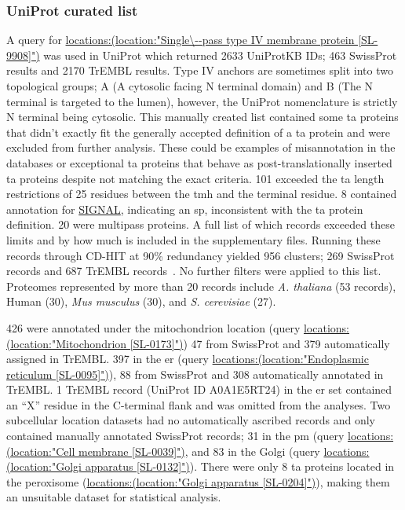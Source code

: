 \subsubsection{UniProt curated list}
A query for \url{locations:(location:"Single\--pass type IV membrane protein [SL-9908]")} was used in UniProt which returned 2633 UniProtKB IDs; 463 SwissProt results and 2170 TrEMBL results.
Type IV anchors are sometimes split into two topological groups; A (A cytosolic facing N terminal domain) and B (The N terminal is targeted to the lumen), however, the UniProt nomenclature is strictly N terminal being cytosolic.
This manually created list contained some \gls{ta} proteins that didn't exactly fit the generally accepted definition of a \gls{ta} protein and were excluded from further analysis.
These could be examples of misannotation in the databases or exceptional \gls{ta} proteins that behave as post\--translationally inserted \gls{ta} proteins despite not matching the exact criteria.
101 exceeded the \gls{ta} length restrictions of 25 residues between the \gls{tmh} and the terminal residue.
8 contained annotation for \url{SIGNAL}, indicating an \gls{sp}, inconsistent with the \gls{ta} protein definition.
20 were multipass proteins.
A full list of which records exceeded these limits and by how much is included in the supplementary files.
Running these records through CD-HIT at 90\% redundancy yielded 956 clusters; 269 SwissProt records and 687 TrEMBL records~\cite{Huang2010, Wu2011}.
No further filters were applied to this list.
Proteomes represented by more than 20 records include \textit{A. thaliana} (53 records), Human (30), \textit{Mus musculus} (30), and \textit{S. cerevisiae} (27). %

426 were annotated under the mitochondrion location (query \url{locations:(location:"Mitochondrion [SL-0173]")}) 47 from SwissProt and 379 automatically assigned in TrEMBL.
397 in the \gls{er} (query \url{locations:(location:"Endoplasmic reticulum [SL-0095]")}), 88 from SwissProt and 308 automatically annotated in TrEMBL.
1 TrEMBL record (UniProt ID A0A1E5RT24) in the \gls{er} set contained an ``X'' residue in the C\--terminal flank and was omitted from the analyses.
Two subcellular location datasets had no automatically ascribed records and only contained manually annotated SwissProt records; 31 in the \gls{pm} (query \url{locations:(location:"Cell membrane [SL-0039]")}, and 83 in the Golgi (query \url{locations:(location:"Golgi apparatus [SL-0132]")}).
There were only 8 \gls{ta} proteins located in the peroxisome (\url{locations:(location:"Golgi apparatus [SL-0204]")}), making them an unsuitable dataset for statistical analysis.


